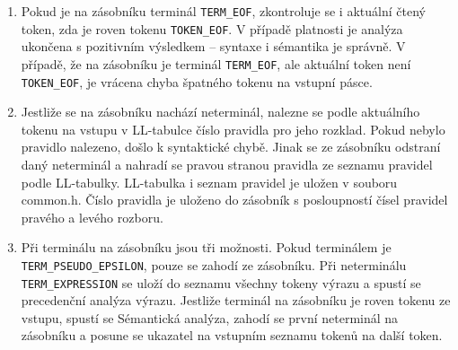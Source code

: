 \documentclass[a4paper, 12pt]{article}
\begin{document}
\begin{enumerate}
    \item Pokud je na zásobníku terminál \verb|TERM_EOF|, zkontroluje se i aktuální čtený token, zda je roven tokenu \verb|TOKEN_EOF|. V případě platnosti je analýza ukončena s pozitivním výsledkem – syntaxe i sémantika je správně. V případě, že na zásobníku je terminál \verb|TERM_EOF|, ale aktuální token není \verb|TOKEN_EOF|, je vrácena chyba špatného tokenu na vstupní pásce.
    \newpage
    \item Jestliže se na zásobníku nachází neterminál, nalezne se podle aktuálního tokenu na vstupu
    v LL-tabulce číslo pravidla pro jeho rozklad. Pokud nebylo pravidlo nalezeno, došlo k syntaktické chybě. Jinak se ze zásobníku odstraní daný neterminál a nahradí se pravou stranou pravidla ze seznamu pravidel podle LL-tabulky. LL-tabulka i seznam pravidel je uložen v souboru common.h. Číslo pravidla je uloženo do zásobník s posloupností čísel pravidel pravého a levého rozboru.
    \item Při terminálu na zásobníku jsou tři možnosti. Pokud terminálem je \verb|TERM_PSEUDO_EPSILON|, pouze se zahodí ze zásobníku. Při neterminálu \verb|TERM_EXPRESSION| se uloží do seznamu všechny tokeny výrazu a spustí se precedenční analýza výrazu. Jestliže terminál na zásobníku je roven tokenu ze vstupu, spustí se Sémantická analýza, zahodí se první neterminál na zásobníku a posune se ukazatel na vstupním seznamu tokenů na další token.
\end{enumerate}
\end{document}

